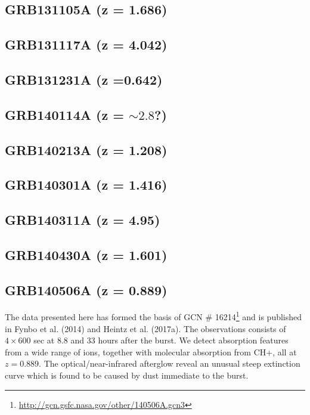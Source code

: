 \documentclass{aa}    %
\begin{document}
\subsection{GRB131105A (z = 1.686)}	




\subsection{GRB131117A (z = 4.042)}	




\subsection{GRB131231A (z =0.642)}	



\subsection{GRB140114A (z = $\sim2.8$?)}	



\subsection{GRB140213A (z = 1.208)}	



\subsection{GRB140301A (z = 1.416)}	



\subsection{GRB140311A (z = 4.95)}	



\subsection{GRB140430A (z = 1.601)}	



\subsection{GRB140506A  (z = 0.889)}	
The data presented here has formed the basis of GCN \#
16214\footnote{\url{http://gcn.gsfc.nasa.gov/other/140506A.gcn3}} and is
published in Fynbo et al. (2014) and Heintz et al. (2017a). The observations
consists of $4\times 600$ sec at 8.8 and 33 hours after the burst. We detect
absorption features from a wide range of ions, together with molecular
absorption from CH+, all at $z=0.889$. The optical/near-infrared afterglow
reveal an unusual steep extinction curve which is found to be caused by dust
immediate to the burst.
\end{document}
